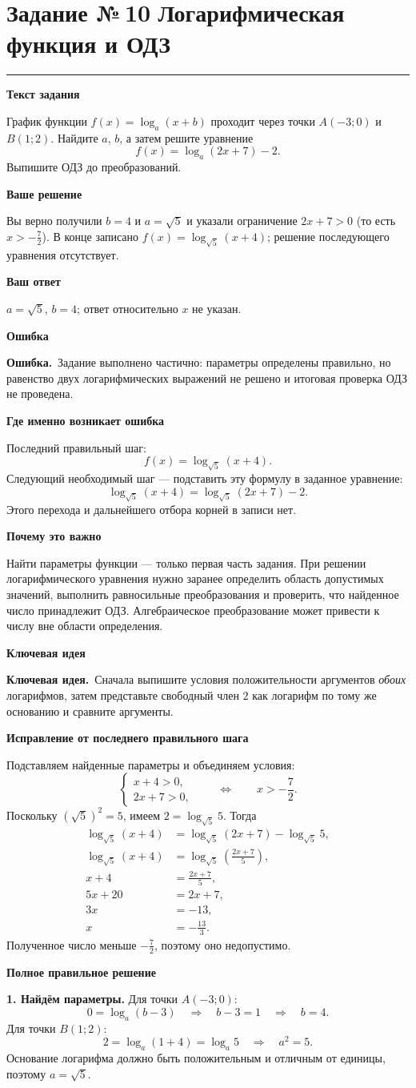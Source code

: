 \documentclass[a4paper,12pt]{article}
\newcommand{\reviewlabel}[1]{\par\smallskip\textbf{\color{accent}#1}\par\nobreak}
\newcommand{\errortext}{\textbf{\color{error}Ошибка.}\ }
\newcommand{\ideatext}{\textbf{\color{hint}Ключевая идея.}\ }
\newcommand{\sep}{\vspace{4pt}\par\noindent\color{rulegray}\rule{\linewidth}{0.35pt}\color{black}\vspace{4pt}}
\newcommand{\tasktitle}[2]{\clearpage\phantomsection\label{task:#1}\section*{Задание №\,#1\,\,\textcolor{accent}{\normalfont\large #2}}\vspace{-3pt}\sep}
\begin{document}
\tasktitle{10}{Логарифмическая функция и ОДЗ}
\reviewlabel{Текст задания}
График функции $f(x)=\log_a(x+b)$ проходит через точки $A(-3;0)$ и $B(1;2)$. Найдите $a$, $b$, а затем решите уравнение
\[
f(x)=\log_a(2x+7)-2.
\]
Выпишите ОДЗ до преобразований.
\reviewlabel{Ваше решение}
Вы верно получили $b=4$ и $a=\sqrt5$ и указали ограничение $2x+7>0$ (то есть $x>-\frac72$). В конце записано $f(x)=\log_{\sqrt5}(x+4)$; решение последующего уравнения отсутствует.
\reviewlabel{Ваш ответ}
$a=\sqrt5$, $b=4$; ответ относительно $x$ не указан.
\reviewlabel{Ошибка}
\errortext Задание выполнено частично: параметры определены правильно, но равенство двух логарифмических выражений не решено и итоговая проверка ОДЗ не проведена.
\reviewlabel{Где именно возникает ошибка}
Последний правильный шаг:
\[
f(x)=\log_{\sqrt5}(x+4).
\]
Следующий необходимый шаг --- подставить эту формулу в заданное уравнение:
\[
\log_{\sqrt5}(x+4)=\log_{\sqrt5}(2x+7)-2.
\]
Этого перехода и дальнейшего отбора корней в записи нет.
\reviewlabel{Почему это важно}
Найти параметры функции --- только первая часть задания. При решении логарифмического уравнения нужно заранее определить область допустимых значений, выполнить равносильные преобразования и проверить, что найденное число принадлежит ОДЗ. Алгебраическое преобразование может привести к числу вне области определения.
\reviewlabel{Ключевая идея}
\ideatext Сначала выпишите условия положительности аргументов \emph{обоих} логарифмов, затем представьте свободный член $2$ как логарифм по тому же основанию и сравните аргументы.
\reviewlabel{Исправление от последнего правильного шага}
Подставляем найденные параметры и объединяем условия:
\[
\begin{cases}x+4>0,\\2x+7>0,\end{cases}
\qquad\Longleftrightarrow\qquad x>-\frac72.
\]
Поскольку $(\sqrt5)^2=5$, имеем $2=\log_{\sqrt5}5$. Тогда
\begin{align*}
\log_{\sqrt5}(x+4)&=\log_{\sqrt5}(2x+7)-\log_{\sqrt5}5,\\
\log_{\sqrt5}(x+4)&=\log_{\sqrt5}\!\left(\frac{2x+7}{5}\right),\\
x+4&=\frac{2x+7}{5},\\
5x+20&=2x+7,\\
3x&=-13,\\
x&=-\frac{13}{3}.
\end{align*}
Полученное число меньше $-\frac72$, поэтому оно недопустимо.
\reviewlabel{Полное правильное решение}
\textbf{1. Найдём параметры.} Для точки $A(-3;0)$:
\[
0=\log_a(b-3)\quad\Longrightarrow\quad b-3=1
\quad\Longrightarrow\quad b=4.
\]
Для точки $B(1;2)$:
\[
2=\log_a(1+4)=\log_a5
\quad\Longrightarrow\quad a^2=5.
\]
Основание логарифма должно быть положительным и отличным от единицы, поэтому $a=\sqrt5$.
\end{document}
